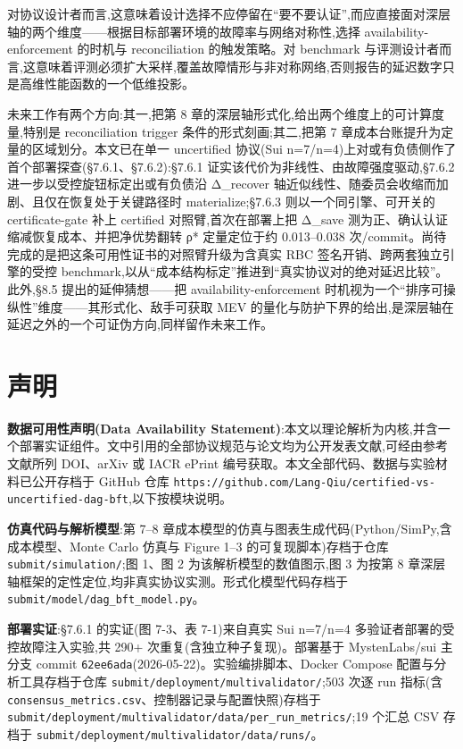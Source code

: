 \documentclass[UTF8,fontset=windows,a4paper,11pt]{ctexart}
\begin{document}
对协议设计者而言,这意味着设计选择不应停留在``要不要认证'',而应直接面对深层轴的两个维度------根据目标部署环境的故障率与网络对称性,选择
availability-enforcement 的时机与 reconciliation 的触发策略。对
benchmark
与评测设计者而言,这意味着评测必须扩大采样,覆盖故障情形与非对称网络,否则报告的延迟数字只是高维性能函数的一个低维投影。

未来工作有两个方向:其一,把第 8
章的深层轴形式化,给出两个维度上的可计算度量,特别是 reconciliation
trigger 条件的形式刻画;其二,把第 7
章成本台账提升为定量的区域划分。本文已在单一 uncertified 协议(Sui
n=7/n=4)上对或有负债侧作了首个部署探查(§7.6.1、§7.6.2):§7.6.1
证实该代价为非线性、由故障强度驱动,§7.6.2
进一步以受控旋钮标定出或有负债沿 Δ\_recover
轴近似线性、随委员会收缩而加剧、且仅在恢复处于关键路径时
materialize;§7.6.3 则以一个同引擎、可开关的 certificate-gate 补上
certified 对照臂,首次在部署上把 Δ\_save
测为正、确认认证缩减恢复成本、并把净优势翻转 ρ* 定量定位于约
0.013--0.038 次/commit。尚待完成的是把这条可用性证书的对照臂升级为含真实
RBC 签名开销、跨两套独立引擎的受控
benchmark,以从``成本结构标定''推进到``真实协议对的绝对延迟比较''。此外,§8.5
提出的延伸猜想------把 availability-enforcement
时机视为一个``排序可操纵性''维度------其形式化、敌手可获取
MEV 的量化与防护下界的给出,是深层轴在延迟之外的一个可证伪方向,同样留作未来工作。

\section{声明}\label{sec:declaration}

\textbf{数据可用性声明(Data Availability
Statement)}:本文以理论解析为内核,并含一个部署实证组件。文中引用的全部协议规范与论文均为公开发表文献,可经由参考文献所列
DOI、arXiv 或 IACR ePrint 编号获取。本文全部代码、数据与实验材料已公开存档于
GitHub 仓库
\texttt{https://\allowbreak{}github.com/\allowbreak{}Lang-Qiu/\allowbreak{}certified-vs-uncertified-dag-bft},以下按模块说明。

\textbf{仿真代码与解析模型}:第 7--8
章成本模型的仿真与图表生成代码(Python/SimPy,含成本模型、Monte Carlo 仿真与
Figure 1--3 的可复现脚本)存档于仓库
\texttt{submit/\allowbreak{}simulation/\allowbreak{}};图 1、图 2
为该解析模型的数值图示,图 3 为按第 8
章深层轴框架的定性定位,均非真实协议实测。形式化模型代码存档于
\texttt{submit/\allowbreak{}model/\allowbreak{}dag\_\allowbreak{}bft\_\allowbreak{}model.py}。

\textbf{部署实证}:§7.6.1 的实证(图 7-3、表
7-1)来自真实 Sui n=7/n=4 多验证者部署的受控故障注入实验,共 290+
次重复(含独立种子复现)。部署基于 MystenLabs/sui 主分支 commit
\texttt{62ee6ada}(2026-05-22)。实验编排脚本、Docker Compose 配置与分析工具存档于仓库
\texttt{submit/\allowbreak{}deployment/\allowbreak{}multivalidator/\allowbreak{}};503 次逐 run
指标(含 \texttt{consensus\_metrics.csv}、控制器记录与配置快照)存档于
\texttt{submit/\allowbreak{}deployment/\allowbreak{}multivalidator/\allowbreak{}data/\allowbreak{}per\_\allowbreak{}run\_\allowbreak{}metrics/\allowbreak{}};19
个汇总 CSV 存档于
\texttt{submit/\allowbreak{}deployment/\allowbreak{}multivalidator/\allowbreak{}data/\allowbreak{}runs/\allowbreak{}}。
\end{document}
